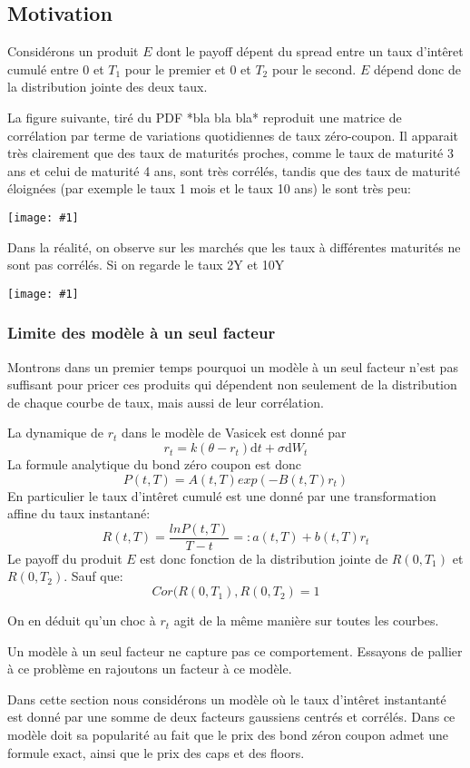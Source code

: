 \documentclass[paper=a4, fontsize=11pt]{scrartcl}
\numberwithin{equation}{section}		%
\numberwithin{figure}{section}			%
\numberwithin{table}{section}				%
\theoremstyle{definition}
\newcommand{\IMG}[3]{
  \begin{center}
    \texttt{[image: \#1]}%
    \end{center}
}
\begin{document}
\subsection{Motivation}


Considérons un produit $E$ dont le payoff  dépent  du spread entre un taux d'intêret cumulé entre $0$ et $T_1$ pour le premier et $0$ et $T_2$ pour le second. $E$ dépend donc de la distribution jointe des deux taux.

La figure suivante, tiré du PDF *bla bla bla* reproduit une matrice de corrélation par terme de variations quotidiennes de taux zéro-coupon. Il apparait très clairement que des taux de maturités proches, comme le taux de maturité 3 ans et celui de maturité 4 ans, sont très corrélés, tandis que des taux de maturité éloignées (par exemple le taux 1 mois et le taux 10 ans) le sont très peu:

\IMG{img/tabcorr.png}{Tableau de correlation}{0.3}

Dans la réalité, on observe sur les marchés que les taux à différentes maturités ne sont pas corrélés. Si on regarde le taux 2Y et 10Y

\IMG{img/libor.png}{Libor}{1}

\subsubsection*{Limite des modèle à un seul facteur}
Montrons dans un premier temps pourquoi un modèle à un seul facteur n'est pas suffisant pour pricer ces produits qui dépendent non seulement de la distribution de chaque courbe de taux, mais aussi de leur corrélation. 

La dynamique de $r_t$ dans le modèle de Vasicek est donné par
$$r_t = k(\theta - r_t)  \mathrm{d}t  + \sigma \mathrm{d}W_t$$
La formule analytique du bond zéro coupon est donc
$$P(t, T) = A(t, T) exp(-B(t, T) r_t)$$
En particulier le taux d'intêret cumulé est une donné par une transformation affine du taux instantané:
$$R(t, T) = \frac{ln P(t, T)}{T-t} =: a(t, T) + b(t, T) r_t$$
Le payoff du produit $E$ est donc fonction de la distribution jointe de $R(0, T_1)$ et $R(0, T_2)$. Sauf que:
$$Cor(R(0, T_1), R(0, T_2) = 1$$

On en déduit qu'un choc à $r_t$ agit de la même manière sur toutes les courbes.


Un modèle à un seul facteur ne capture pas ce comportement. Essayons de pallier à ce problème en rajoutons un facteur à ce modèle.

Dans cette section nous considérons un modèle où le taux d'intêret instantanté est donné par une somme de deux facteurs gaussiens centrés et corrélés. Dans ce modèle doit sa popularité au fait que le prix des bond zéron coupon admet une formule exact, ainsi que le prix des caps et des floors.
\end{document}
